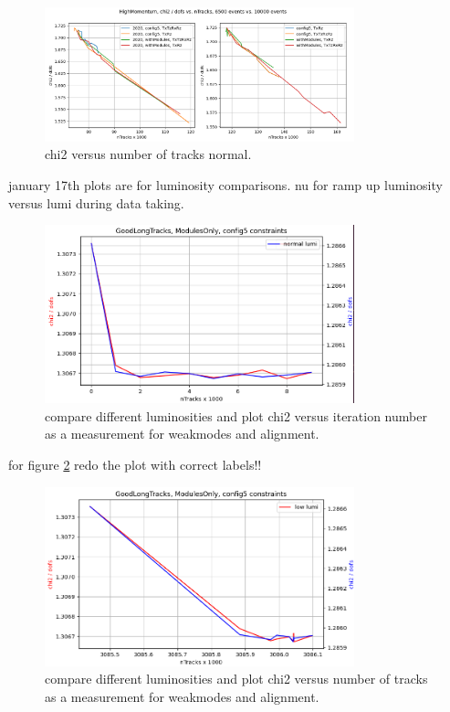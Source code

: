 \begin{figure}
  \centering
  \includegraphics[width=0.8\textwidth]{plots/LHCB_week_dec/chi2_vs_tracks_normal.png}
  \caption{chi2 versus number of tracks normal.}
  \label{fig:chi2tracksdec}
\end{figure}

january 17th plots are for luminosity comparisons.
nu for ramp up luminosity versus lumi during data taking.

\begin{figure}
  \centering
  \includegraphics[width=0.8\textwidth]{plots/jan_17_2022/chi2_iter_low_vs_normal.png}
  \caption{compare different luminosities and plot chi2 versus iteration number as a measurement for weakmodes and alignment.}
  \label{fig:chi2iter_lumi_normal}
\end{figure}

for figure \ref{fig:chi2iter_lumi_normal} redo the plot with correct labels!!

\begin{figure}
  \centering
  \includegraphics[width=0.8\textwidth]{plots/jan_17_2022/chi2_tracks_modulesOnly.png}
  \caption{compare different luminosities and plot chi2 versus number of tracks as a measurement for weakmodes and alignment.}
  \label{fig:chi2tracks_lumi_normal}
\end{figure}

